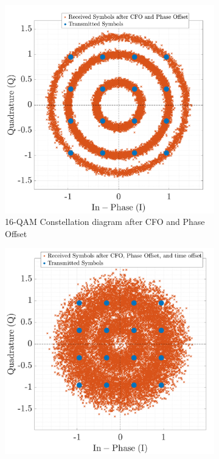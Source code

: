 \begin{figure}[H]
	\centering
	\begin{subfigure}[b]{0.48\textwidth}
		\centering
		\includegraphics[width=\linewidth]{Images/cfo-po}
		\caption{16-QAM Constellation diagram after CFO and Phase Offset}
		\label{fig:cfo-po-sub}
	\end{subfigure}
	\hfill %
	\begin{subfigure}[b]{0.48\textwidth}
		\centering
		\includegraphics[width=\linewidth]{Images/cfo-po-to}

\end{subfigure}
\end{figure}
